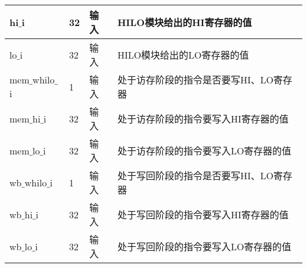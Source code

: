 \begin{table}[H]
\begin{tabular}{|l|l|l|l|}
		\hline
		hi$\_$i & 32 & 输入 & HILO模块给出的HI寄存器的值 \\
		\hline
		lo$\_$i & 32 & 输入 & HILO模块给出的LO寄存器的值 \\
		\hline
		mem$\_$whilo$\_$i & 1 & 输入 & 处于访存阶段的指令是否要写HI、LO寄存器 \\
		\hline
		mem$\_$hi$\_$i & 32 & 输入 & 处于访存阶段的指令要写入HI寄存器的值 \\
		\hline
		mem$\_$lo$\_$i & 32 & 输入 & 处于访存阶段的指令要写入LO寄存器的值 \\
		\hline
		wb$\_$whilo$\_$i & 1 & 输入 & 处于写回阶段的指令是否要写HI、LO寄存器 \\
		\hline
		wb$\_$hi$\_$i & 32 & 输入 & 处于写回阶段的指令要写入HI寄存器的值 \\
		\hline
		wb$\_$lo$\_$i & 32 & 输入 & 处于写回阶段的指令要写入LO寄存器的值 \\
		\hline
	\end{tabular}
\end{table}
